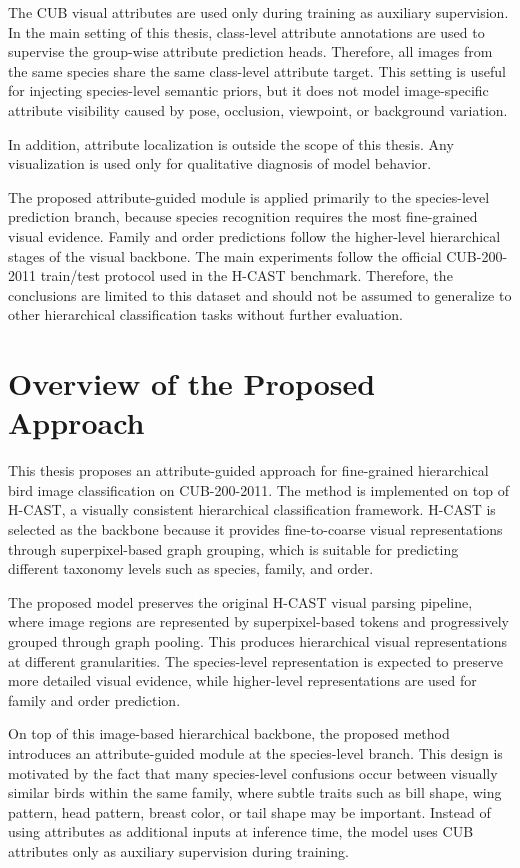 The CUB visual attributes are used only during training as auxiliary supervision. In the main setting of this thesis, class-level attribute annotations are used to supervise the group-wise attribute prediction heads. Therefore, all images from the same species share the same class-level attribute target. This setting is useful for injecting species-level semantic priors, but it does not model image-specific attribute visibility caused by pose, occlusion, viewpoint, or background variation.

In addition, attribute localization is outside the scope of this thesis. Any visualization is used only for qualitative diagnosis of model behavior.

The proposed attribute-guided module is applied primarily to the species-level prediction branch, because species recognition requires the most fine-grained visual evidence. Family and order predictions follow the higher-level hierarchical stages of the visual backbone. The main experiments follow the official CUB-200-2011 train/test protocol used in the H-CAST benchmark. Therefore, the conclusions are limited to this dataset and should not be assumed to generalize to other hierarchical classification tasks without further evaluation.




\section{Overview of the Proposed Approach}

This thesis proposes an attribute-guided approach for fine-grained hierarchical bird image classification on CUB-200-2011. The method is implemented on top of H-CAST, a visually consistent hierarchical classification framework. H-CAST is selected as the backbone because it provides fine-to-coarse visual representations through superpixel-based graph grouping, which is suitable for predicting different taxonomy levels such as species, family, and order.

The proposed model preserves the original H-CAST visual parsing pipeline, where image regions are represented by superpixel-based tokens and progressively grouped through graph pooling. This produces hierarchical visual representations at different granularities. The species-level representation is expected to preserve more detailed visual evidence, while higher-level representations are used for family and order prediction.

On top of this image-based hierarchical backbone, the proposed method introduces an attribute-guided module at the species-level branch. This design is motivated by the fact that many species-level confusions occur between visually similar birds within the same family, where subtle traits such as bill shape, wing pattern, head pattern, breast color, or tail shape may be important. Instead of using attributes as additional inputs at inference time, the model uses CUB attributes only as auxiliary supervision during training.

